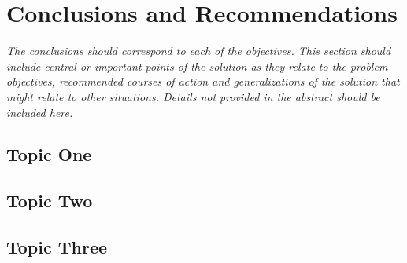 \chapter{Conclusions and Recommendations}
\label{cha:Conclusions}      %

\emph{The conclusions should correspond to each of the objectives. 
This section should include central or important points of the solution as they relate to the problem objectives, recommended courses of action and generalizations of the solution that might relate to other situations. 
Details not provided in the abstract should be included here.
}
\section{Topic One}
\lipsum
\section{Topic Two}
\lipsum
\section{Topic Three}
\lipsum